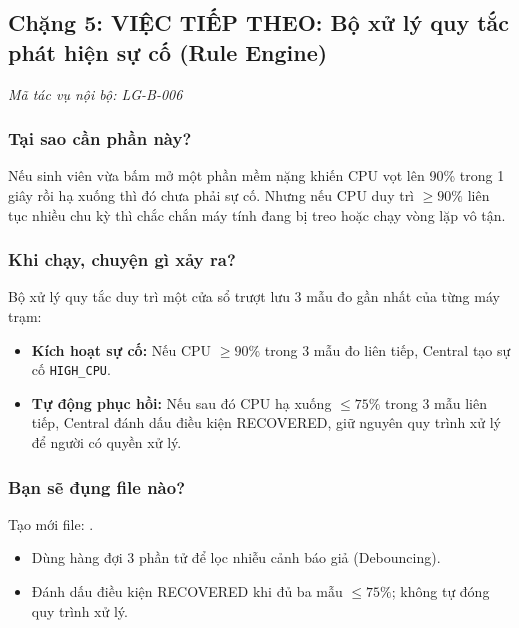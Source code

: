\documentclass[12pt,a4paper]{article}
\begin{document}
\subsection{Chặng 5: VIỆC TIẾP THEO: Bộ xử lý quy tắc phát hiện sự cố (Rule Engine)}
{\footnotesize\color{lgGray}\textit{Mã tác vụ nội bộ: LG-B-006}}\par
\vspace{2mm}

\subsubsection{Tại sao cần phần này?}
Nếu sinh viên vừa bấm mở một phần mềm nặng khiến CPU vọt lên 90\% trong 1 giây rồi hạ xuống thì đó chưa phải sự cố. Nhưng nếu CPU duy trì $\ge 90\%$ liên tục nhiều chu kỳ thì chắc chắn máy tính đang bị treo hoặc chạy vòng lặp vô tận.

\subsubsection{Khi chạy, chuyện gì xảy ra?}
Bộ xử lý quy tắc duy trì một cửa sổ trượt lưu 3 mẫu đo gần nhất của từng máy trạm:
\begin{itemize}
  \item \textbf{Kích hoạt sự cố:} Nếu CPU $\ge 90\%$ trong 3 mẫu đo liên tiếp, Central tạo sự cố \texttt{HIGH\_CPU}.
  \item \textbf{Tự động phục hồi:} Nếu sau đó CPU hạ xuống $\le 75\%$ trong 3 mẫu liên tiếp, Central đánh dấu điều kiện RECOVERED, giữ nguyên quy trình xử lý để người có quyền xử lý.
\end{itemize}

\subsubsection{Bạn sẽ đụng file nào?}
Tạo mới file: .

\begin{orientationbox}
\begin{itemize}[leftmargin=1.5em, itemsep=1pt]
  \item Dùng hàng đợi 3 phần tử để lọc nhiễu cảnh báo giả (Debouncing).
  \item Đánh dấu điều kiện RECOVERED khi đủ ba mẫu $\le 75\%$; không tự đóng quy trình xử lý.
\end{itemize}
\end{orientationbox}
\end{document}
